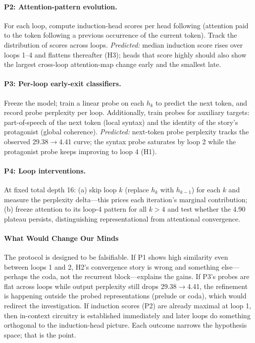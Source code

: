 \paragraph{P2: Attention-pattern evolution.} For each loop, compute
induction-head scores per head following \citet{elhage2021mathematical}
(attention paid to the token following a previous occurrence of the
current token). Track the distribution of scores across loops.
\emph{Predicted:} median induction score rises over loops 1--4 and
flattens thereafter (H3); heads that score highly should also show
the largest cross-loop attention-map change early and the smallest
late.

\paragraph{P3: Per-loop early-exit classifiers.} Freeze the model;
train a linear probe on each $h_k$ to predict the next token, and
record probe perplexity per loop. Additionally, train probes for
auxiliary targets: part-of-speech of the next token (local syntax)
and the identity of the story's protagonist (global coherence).
\emph{Predicted:} next-token probe perplexity tracks the observed
29.38$\rightarrow$4.41 curve; the syntax probe saturates by loop 2
while the protagonist probe keeps improving to loop 4 (H1).

\paragraph{P4: Loop interventions.} At fixed total depth 16: (a) skip
loop $k$ (replace $h_k$ with $h_{k-1}$) for each $k$ and measure the
perplexity delta---this prices each iteration's marginal contribution;
(b) freeze attention to its loop-4 pattern for all $k > 4$ and test
whether the 4.90 plateau persists, distinguishing representational
from attentional convergence.

\paragraph{What Would Change Our Minds}

The protocol is designed to be falsifiable. If P1 shows high
similarity even between loops 1 and 2, H2's convergence story is
wrong and something else---perhaps the coda, not the recurrent
block---explains the gains. If P3's probes are flat across loops
while output perplexity still drops 29.38$\rightarrow$4.41, the
refinement is happening outside the probed representations (prelude
or coda), which would redirect the investigation. If induction scores
(P2) are already maximal at loop 1, then in-context circuitry is
established immediately and later loops do something orthogonal to
the induction-head picture. Each outcome narrows the hypothesis
space; that is the point.

